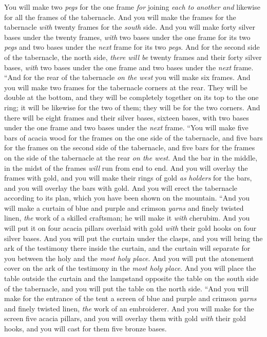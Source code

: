 \begin{biblechapter}
\verse You will make two \textit{pegs} for the one frame \textit{for} joining \textit{each to another} \textit{and} likewise for all the frames of the tabernacle.
\verse And you will make the frames for the tabernacle \textit{with} twenty frames for the \textit{south} side.
\verse And you will make forty silver bases under the twenty frames, \textit{with} two bases under the one frame for its two \textit{pegs} and two bases under the \textit{next} frame for its two \textit{pegs}.
\verse And for the second side of the tabernacle, the north side, \textit{there will be} twenty frames
\verse and their forty silver bases, \textit{with} two bases under the one frame and two bases under the \textit{next} frame.
\verse “And for the rear of the tabernacle \textit{on the west} you will make six frames.
\verse And you will make two frames for the tabernacle corners at the rear.
\verse They will be double at the bottom, and they will be completely together on its top to the one ring; it will be likewise for the two of them; they will be for the two corners.
\verse And there will be eight frames and their silver bases, sixteen bases, with two bases under the one frame and two bases under the \textit{next} frame.
\verse “You will make five bars of acacia wood for the frames on the one side of the tabernacle,
\verse and five bars for the frames on the second side of the tabernacle, and five bars for the frames on the side of the tabernacle at the rear \textit{on the west}.
\verse And the bar in the middle, in the midst of the frames \textit{will} run from end to end.
\verse And you will overlay the frames with gold, and you will make their rings of gold \textit{as} \textit{holders} for the bars, and you will overlay the bars with gold.
\verse And you will erect the tabernacle according to its plan, which you have been shown on the mountain.
\verse “And you will make a curtain of blue and purple and crimson \textit{yarns} and finely twisted linen, \textit{the} work of a skilled craftsman; he will make it \textit{with} cherubim.
\verse And you will put it on four acacia pillars overlaid with gold \textit{with} their gold hooks on four silver bases.
\verse And you will put the curtain under the clasps, and you will bring the ark of the testimony there inside the curtain, and the curtain will separate for you between the holy and the \textit{most holy place}.
\verse And you will put the atonement cover on the ark of the testimony in the \textit{most holy place}.
\verse And you will place the table outside the curtain and the lampstand opposite the table on the south side of the tabernacle, and you will put the table on the north side.
\verse “And you will make for the entrance of the tent a screen of blue and purple and crimson \textit{yarns} and finely twisted linen, \textit{the} work of an embroiderer.
\verse And you will make for the screen five acacia pillars, and you will overlay them with gold \textit{with} their gold hooks, and you will cast for them five bronze bases.
\end{biblechapter}

